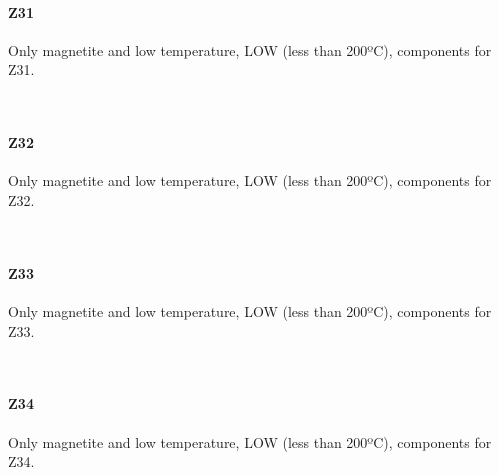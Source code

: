 \documentclass[11pt]{article}
\begin{document}
    \paragraph{Z31}\label{z31}

    Only magnetite and low temperature, LOW (less than 200ºC), components
for Z31.



    \begin{center}
    \end{center}
    { \hspace*{\fill} \\}
    
    \paragraph{Z32}\label{z32}

    Only magnetite and low temperature, LOW (less than 200ºC), components
for Z32.



    \begin{center}
    \end{center}
    { \hspace*{\fill} \\}
    
    \paragraph{Z33}\label{z33}

    Only magnetite and low temperature, LOW (less than 200ºC), components
for Z33.



    \begin{center}
    \end{center}
    { \hspace*{\fill} \\}
    
    \paragraph{Z34}\label{z34}

    Only magnetite and low temperature, LOW (less than 200ºC), components
for Z34.
\end{document}
